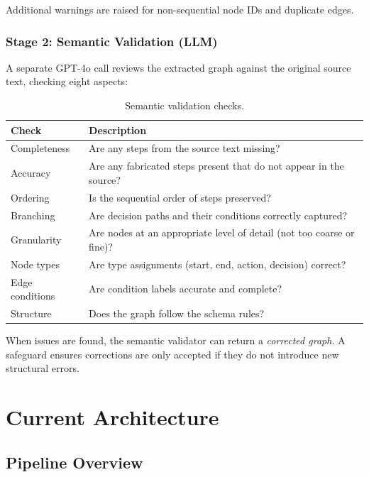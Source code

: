 \documentclass[12pt,a4paper]{article}
\begin{document}
Additional warnings are raised for non-sequential node IDs and duplicate edges.

\subsubsection{Stage 2: Semantic Validation (LLM)}

A separate GPT-4o call reviews the extracted graph against the original source text, checking eight aspects:

\begin{table}[H]
\centering
\caption{Semantic validation checks.}
\label{tab:semantic-checks}
\begin{tabularx}{\textwidth}{l X}
\toprule
\textbf{Check} & \textbf{Description} \\
\midrule
Completeness    & Are any steps from the source text missing? \\
Accuracy        & Are any fabricated steps present that do not appear in the source? \\
Ordering        & Is the sequential order of steps preserved? \\
Branching       & Are decision paths and their conditions correctly captured? \\
Granularity     & Are nodes at an appropriate level of detail (not too coarse or fine)? \\
Node types      & Are type assignments (start, end, action, decision) correct? \\
Edge conditions & Are condition labels accurate and complete? \\
Structure       & Does the graph follow the schema rules? \\
\bottomrule
\end{tabularx}
\end{table}

When issues are found, the semantic validator can return a \emph{corrected graph}. A safeguard ensures corrections are only accepted if they do not introduce new structural errors.

\section{Current Architecture}
\label{sec:architecture}

\subsection{Pipeline Overview}
\end{document}
